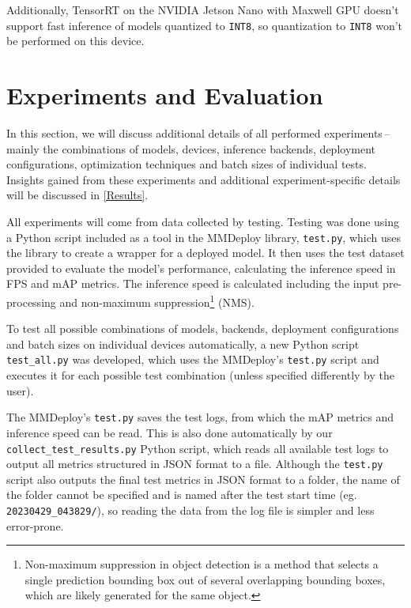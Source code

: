 Additionally, TensorRT on the NVIDIA Jetson Nano with Maxwell GPU doesn't
support fast inference of models quantized to \texttt{INT8}, so quantization to
\texttt{INT8} won't be performed on this device.



\section{Experiments and Evaluation}

In this section, we will discuss additional details of all performed
experiments\,--\,mainly the combinations of models, devices, inference backends,
deployment configurations, optimization techniques and batch sizes of individual
tests. Insights gained from these experiments and additional experiment-specific
details will be discussed in \autoref{Results}.

All experiments will come from data collected by testing. Testing was done using
a Python script included as a tool in the MMDeploy library, \texttt{test.py},
which uses the library to create a wrapper for a deployed model. It then uses
the test dataset provided to evaluate the model's performance, calculating the
inference speed in FPS and mAP metrics. The inference speed is calculated
including the input pre-processing and non-maximum
suppression\footnote{Non-maximum suppression in object detection is a method
that selects a single prediction bounding box out of several overlapping
bounding boxes, which are likely generated for the same object.} (NMS).

To test all possible combinations of models, backends, deployment configurations
and batch sizes on individual devices automatically, a new Python script
\texttt{test\_all.py} was developed, which uses the MMDeploy's \texttt{test.py}
script and executes it for each possible test combination (unless specified
differently by the user).

The MMDeploy's \texttt{test.py} saves the test logs, from which the mAP metrics
and inference speed can be read. This is also done automatically by our
\texttt{collect\_test\_results.py} Python script, which reads all available test
logs to output all metrics structured in JSON format to a file. Although the
\texttt{test.py} script also outputs the final test metrics in JSON format to a
folder, the name of the folder cannot be specified and is named after the test
start time (eg. \texttt{20230429\_043829/}), so reading the data from the log file
is simpler and less error-prone.


